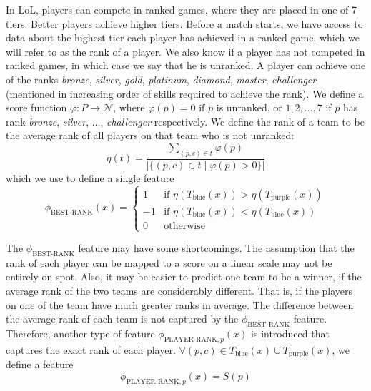 In LoL, players can compete in ranked games, where they are placed in one of 7 tiers. Better players achieve higher tiers.
Before a match starts, we have access to data about the highest tier each player has achieved in a ranked game, which we will refer to as the rank of a player. We also know if a player has not competed in ranked games, in which case we say that he is unranked.
A player can achieve one of the ranks \textit{bronze}, \textit{silver}, \textit{gold}, \textit{platinum}, \textit{diamond}, \textit{master}, \textit{challenger} (mentioned in increasing order of skills required to achieve the rank).
We define a score function $\varphi : P \rightarrow \mathcal{N}$, where $\varphi(p) = 0$ if $p$ is unranked, or $1, 2, \dots, 7$ if $p$ has rank \textit{bronze}, \textit{silver}, $\dots$, \textit{challenger} respectively.
We define the rank of a team to be the average rank of all players on that team who is not unranked:
\begin{equation}\label{eq:eta}
\eta(t) = \frac{\sum\limits_{(p, c) \in t} \varphi(p)}{|\{(p, c) \in t \mid \varphi(p) > 0\}|}
\end{equation}
which we use to define a single feature
\begin{equation}\label{eq:bestrank}
\phi_\text{BEST-RANK}(x) = 
\begin{cases} 
  1 & \text{if } \eta(T_\text{blue}(x)) > \eta(T_\text{purple}(x))\\
  -1 & \text{if } \eta(T_\text{blue}(x)) < \eta(T_\text{blue}(x))\\
  0 & \text{otherwise} 
\end{cases}  
\end{equation}

The $\phi_\text{BEST-RANK}$ feature may have some shortcomings. The assumption that the rank of each player can be mapped to a score on a linear scale may not be entirely on spot.
Also, it may be easier to predict one team to be a winner, if the average rank of the two teams are considerably different. That is, if the players on one of the team have much greater ranks in average. The difference between the average rank of each team is not captured by the $\phi_\text{BEST-RANK}$ feature.
Therefore, another type of feature $\phi_{\text{PLAYER-RANK},p}(x)$ is introduced that captures the exact rank of each player.
$\forall(p, c) \in T_\text{blue}(x) \cup T_\text{purple}(x)$, we define a feature
\begin{equation}\label{eq:playerrank}
\phi_{\text{PLAYER-RANK},p}(x) = S(p)  
\end{equation}

